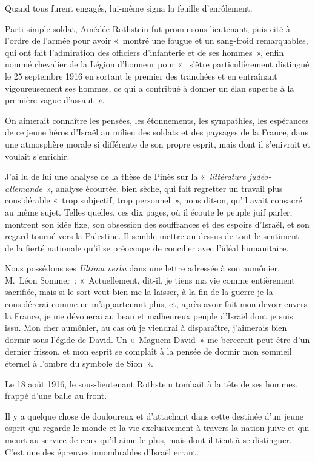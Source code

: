 \documentclass[french,twoside]{book} %
\begin{document}
Quand tous furent engagés, lui-même signa la feuille d’enrôlement.‌\par
Parti simple soldat, Amédée Rothstein fut promu sous-lieutenant, puis cité à l’ordre de l’armée pour avoir « montré une fougue et un sang-froid remarquables, qui ont fait l’admiration des officiers d’infanterie et de ses hommes », enfin nommé chevalier de la Légion d’honneur pour «  s’être particulièrement distingué le 25 septembre 1916 en sortant le premier des tranchées et en entraînant vigoureusement ses hommes, ce qui a contribué à donner un élan superbe à la première vague d’assaut ».‌\par
On aimerait connaître les pensées, les étonnements, les sympathies, les espérances de ce jeune héros d’Israël au milieu des soldats et des paysages de la France, dans une atmosphère morale si différente de son propre esprit, mais dont il s’enivrait et voulait s’enrichir.‌\par
J’ai lu de lui une analyse de la thèse de Pinès sur la « {\itshape littérature judéo-allemande} », analyse écourtée, bien sèche, qui fait regretter un travail plus considérable « trop subjectif, trop personnel », nous dit-on, qu’il avait consacré au même sujet. Telles quelles, ces dix pages, où il écoute le peuple juif parler, montrent son idée fixe, son obsession des souffrances et des espoirs d’Israël, et son regard tourné vers la Palestine. Il semble mettre au-dessus de tout le sentiment de la fierté nationale qu’il se préoccupe de concilier avec l’idéal humanitaire.‌\par
Nous possédons ses {\itshape Ultima verba} dans une lettre adressée à son aumônier, M. Léon Sommer ; « Actuellement, dit-il, je tiens ma vie comme entièrement sacrifiée, mais si le sort veut bien me la laisser, à la fin de la guerre je la considérerai comme ne m’appartenant plus, et, après avoir fait mon devoir envers la France, je me dévouerai au beau et malheureux peuple d’Israël dont je suis issu. Mon cher aumônier, au cas où je viendrai à disparaître, j’aimerais bien dormir sous l’égide de David. Un « Maguem David » me bercerait peut-être d’un dernier frisson, et mon esprit se complaît à la pensée de dormir mon sommeil éternel à l’ombre du symbole de Sion ».‌\par
Le 18 août 1916, le sous-lieutenant Rothstein tombait à la tête de ses hommes, frappé d’une balle au front.‌\par
Il y a quelque chose de douloureux et d’attachant dans cette destinée d’un jeune esprit qui regarde le monde et la vie exclusivement à travers la nation juive et qui meurt au service de ceux qu’il aime le plus, mais dont il tient à se distinguer. C’est une des épreuves innombrables d’Israël errant.‌\par
\end{document}
